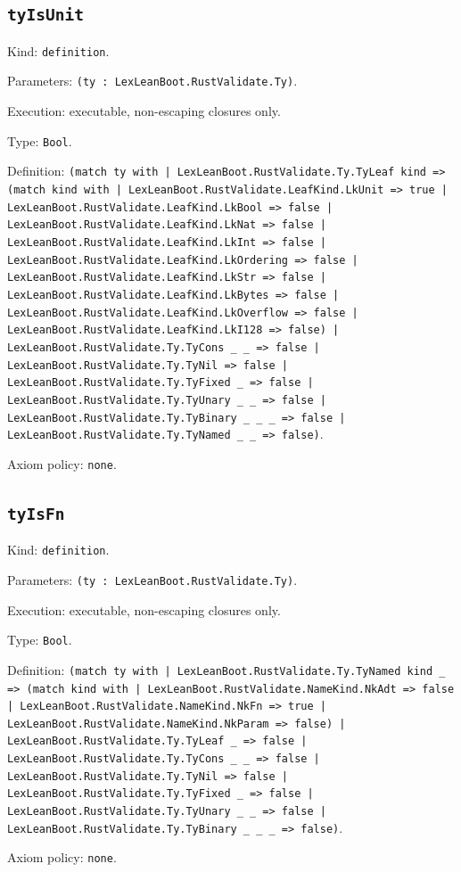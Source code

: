 \documentclass[11pt]{article}
\begin{document}
\subsection*{\texttt{tyIsUnit}}
\noindent Kind: \texttt{definition}.\par
\noindent Parameters: \texttt{(ty : LexLeanBoot.RustValidate.Ty)}.\par
\noindent Execution: executable, non-escaping closures only.\par
\noindent Type: \texttt{Bool}.\par
\noindent Definition: \texttt{(match ty with | LexLeanBoot.RustValidate.Ty.TyLeaf kind => (match kind with | LexLeanBoot.RustValidate.LeafKind.LkUnit => true | LexLeanBoot.RustValidate.LeafKind.LkBool => false | LexLeanBoot.RustValidate.LeafKind.LkNat => false | LexLeanBoot.RustValidate.LeafKind.LkInt => false | LexLeanBoot.RustValidate.LeafKind.LkOrdering => false | LexLeanBoot.RustValidate.LeafKind.LkStr => false | LexLeanBoot.RustValidate.LeafKind.LkBytes => false | LexLeanBoot.RustValidate.LeafKind.LkOverflow => false | LexLeanBoot.RustValidate.LeafKind.LkI128 => false) | LexLeanBoot.RustValidate.Ty.TyCons \_ \_ => false | LexLeanBoot.RustValidate.Ty.TyNil => false | LexLeanBoot.RustValidate.Ty.TyFixed \_ => false | LexLeanBoot.RustValidate.Ty.TyUnary \_ \_ => false | LexLeanBoot.RustValidate.Ty.TyBinary \_ \_ \_ => false | LexLeanBoot.RustValidate.Ty.TyNamed \_ \_ => false)}.\par
\noindent Axiom policy: \texttt{none}.\par
\subsection*{\texttt{tyIsFn}}
\noindent Kind: \texttt{definition}.\par
\noindent Parameters: \texttt{(ty : LexLeanBoot.RustValidate.Ty)}.\par
\noindent Execution: executable, non-escaping closures only.\par
\noindent Type: \texttt{Bool}.\par
\noindent Definition: \texttt{(match ty with | LexLeanBoot.RustValidate.Ty.TyNamed kind \_ => (match kind with | LexLeanBoot.RustValidate.NameKind.NkAdt => false | LexLeanBoot.RustValidate.NameKind.NkFn => true | LexLeanBoot.RustValidate.NameKind.NkParam => false) | LexLeanBoot.RustValidate.Ty.TyLeaf \_ => false | LexLeanBoot.RustValidate.Ty.TyCons \_ \_ => false | LexLeanBoot.RustValidate.Ty.TyNil => false | LexLeanBoot.RustValidate.Ty.TyFixed \_ => false | LexLeanBoot.RustValidate.Ty.TyUnary \_ \_ => false | LexLeanBoot.RustValidate.Ty.TyBinary \_ \_ \_ => false)}.\par
\noindent Axiom policy: \texttt{none}.\par
\end{document}
